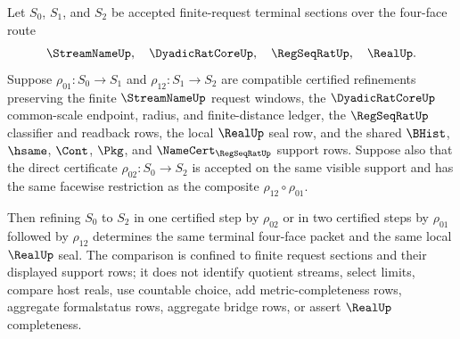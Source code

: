 \begin{theorem}
\label{thm:regseqrat-finite-request-section-refinement-composition}
Let $S_0$, $S_1$, and $S_2$ be accepted finite-request terminal sections over
the four-face route
$$
\StreamNameUp,\quad \DyadicRatCoreUp,\quad \RegSeqRatUp,\quad \RealUp.
$$
Suppose $\rho_{01}:S_0\to S_1$ and $\rho_{12}:S_1\to S_2$ are compatible
certified refinements preserving the finite $\StreamNameUp$ request windows,
the $\DyadicRatCoreUp$ common-scale endpoint, radius, and finite-distance
ledger, the $\RegSeqRatUp$ classifier and readback rows, the local
$\RealUp$ seal row, and the shared $\BHist$, $\hsame$, $\Cont$, $\Pkg$, and
$\NameCert_{\RegSeqRatUp}$ support rows. Suppose also that the direct
certificate $\rho_{02}:S_0\to S_2$ is accepted on the same visible support
and has the same facewise restriction as the composite
$\rho_{12}\circ\rho_{01}$.

Then refining $S_0$ to $S_2$ in one certified step by $\rho_{02}$ or in two
certified steps by $\rho_{01}$ followed by $\rho_{12}$ determines the same
terminal four-face packet and the same local $\RealUp$ seal. The comparison
is confined to finite request sections and their displayed support rows; it
does not identify quotient streams, select limits, compare host reals, use
countable choice, add metric-completeness rows, aggregate formalstatus rows,
aggregate bridge rows, or assert $\RealUp$ completeness.
\end{theorem}
